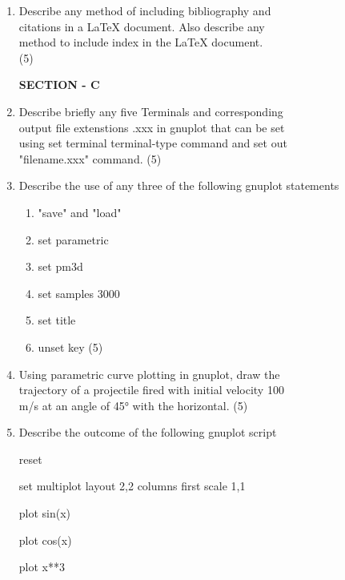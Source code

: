 \documentclass{book}
\begin{document}
\begin{enumerate}
\item Describe any method of including bibliography and \\
 citations in a LaTeX document. Also describe any \\
 method to include index in the LaTeX document.\\
  \phantom{.} \hfill (5)



  \vspace{1em}
  \begin{center} \textbf{SECTION - C} \end{center}


 \item Describe briefly any five Terminals and corresponding \\
 output file extenstions .xxx in gnuplot that can be set \\
 using set terminal terminal-type command and set out \\
"filename.xxx" command. \hfill (5)


\item Describe the use of any three of the following gnuplot statements

\begin{enumerate}[label=(\alph*)]
\setlength\itemsep{1em}
\item "save" and "load"
 \item set parametric
 \item set pm3d
 \item set samples 3000
 \item set title
 \item unset key \hfill (5)

\end{enumerate}


    \item Using parametric curve plotting in gnuplot, draw the \\
    trajectory of a projectile fired with initial velocity 100 \\
     m/s at an angle of 45° with the horizontal. \hfill (5)
    \item Describe the outcome of the following gnuplot script

    reset

    set multiplot layout 2,2 columns first scale 1,1

    plot sin(x)

    plot cos(x)

    plot x**3


\end{enumerate}
\end{document}

